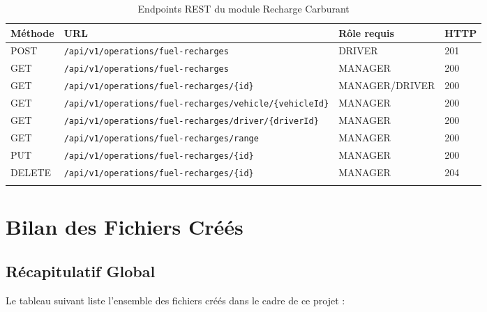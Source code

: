 \documentclass[12pt,a4paper]{report}
\begin{document}
\begin{longtable}{p{1.5cm}p{6.5cm}p{2.5cm}p{2cm}}
\toprule
\textbf{Méthode} & \textbf{URL} & \textbf{Rôle requis} & \textbf{HTTP} \\
\midrule
\endhead
POST & \texttt{/api/v1/operations/fuel-recharges} & DRIVER & 201 \\
GET & \texttt{/api/v1/operations/fuel-recharges} & MANAGER & 200 \\
GET & \texttt{/api/v1/operations/fuel-recharges/\{id\}} & MANAGER/DRIVER & 200 \\
GET & \texttt{/api/v1/operations/fuel-recharges/vehicle/\{vehicleId\}} & MANAGER & 200 \\
GET & \texttt{/api/v1/operations/fuel-recharges/driver/\{driverId\}} & MANAGER & 200 \\
GET & \texttt{/api/v1/operations/fuel-recharges/range} & MANAGER & 200 \\
PUT & \texttt{/api/v1/operations/fuel-recharges/\{id\}} & MANAGER & 200 \\
DELETE & \texttt{/api/v1/operations/fuel-recharges/\{id\}} & MANAGER & 204 \\
\bottomrule
\caption{Endpoints REST du module Recharge Carburant}
\end{longtable}

\section{Bilan des Fichiers Créés}

\subsection{Récapitulatif Global}

Le tableau suivant liste l'ensemble des fichiers créés dans le cadre de ce projet :
\end{document}
